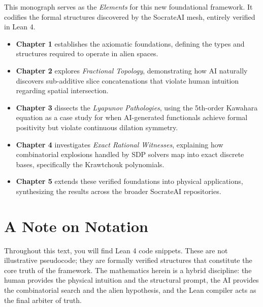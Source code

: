 This monograph serves as the \textit{Elements} for this new foundational framework. It codifies the formal structures discovered by the SocrateAI mesh, entirely verified in Lean 4.

\begin{itemize}
    \item \textbf{Chapter 1} establishes the axiomatic foundations, defining the types and structures required to operate in alien spaces.
    \item \textbf{Chapter 2} explores \textit{Fractional Topology}, demonstrating how AI naturally discovers sub-additive slice concatenations that violate human intuition regarding spatial intersection.
    \item \textbf{Chapter 3} dissects the \textit{Lyapunov Pathologies}, using the 5th-order Kawahara equation as a case study for when AI-generated functionals achieve formal positivity but violate continuous dilation symmetry.
    \item \textbf{Chapter 4} investigates \textit{Exact Rational Witnesses}, explaining how combinatorial explosions handled by SDP solvers map into exact discrete bases, specifically the Krawtchouk polynomials.
    \item \textbf{Chapter 5} extends these verified foundations into physical applications, synthesizing the results across the broader SocrateAI repositories.
\end{itemize}

\section{A Note on Notation}

Throughout this text, you will find Lean 4 code snippets. These are not illustrative pseudocode; they are formally verified structures that constitute the core truth of the framework. The mathematics herein is a hybrid discipline: the human provides the physical intuition and the structural prompt, the AI provides the combinatorial search and the alien hypothesis, and the Lean compiler acts as the final arbiter of truth.
